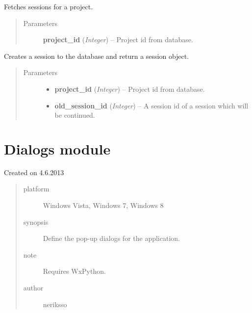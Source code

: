 \documentclass[letterpaper,10pt,english]{sphinxmanual}
\begin{document}
\begin{fulllineitems}
\label{controller:controller.session.get_sessions_by_project}
Fetches sessions for a project.
\begin{quote}\begin{description}
\item[{Parameters}] \leavevmode
\textbf{project\_id} (\emph{Integer}) -- Project id from database.

\end{description}\end{quote}

\end{fulllineitems}


\begin{fulllineitems}
\label{controller:controller.session.start_new_session}
Creates a session to the database and return a session object.
\begin{quote}\begin{description}
\item[{Parameters}] \leavevmode\begin{itemize}
\item {} 
\textbf{project\_id} (\emph{Integer}) -- Project id from database.

\item {} 
\textbf{old\_session\_id} (\emph{Integer}) -- A session id of a session which will be continued.

\end{itemize}

\end{description}\end{quote}

\end{fulllineitems}



\section{Dialogs module}
\label{dialogs:dialogs-module}\label{dialogs::doc}\label{dialogs:module-dialogs}
Created on 4.6.2013
\begin{quote}\begin{description}
\item[{platform}] \leavevmode
Windows Vista, Windows 7, Windows 8

\item[{synopsis}] \leavevmode
Define the pop-up dialogs for the application.

\item[{note}] \leavevmode
Requires WxPython.

\item[{author}] \leavevmode
neriksso

\end{description}\end{quote}
\end{document}
